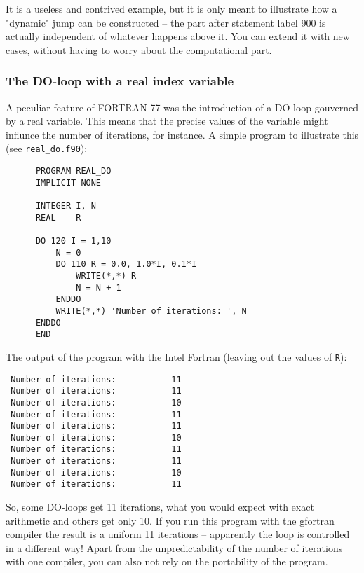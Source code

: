 It is a useless and contrived example, but it is only meant to illustrate how
a "dynamic" jump can be constructed -- the part after statement label 900
is actually independent of whatever happens above it. You can extend it with
new cases, without having to worry about the computational part.

\subsubsection{The DO-loop with a real index variable}
A peculiar feature of FORTRAN 77 was the introduction of a DO-loop gouverned
by a real variable. This means that the precise values of the variable might
influnce the number of iterations, for instance. A simple program to
illustrate this (see \verb+real_do.f90+):
\begin{verbatim}
      PROGRAM REAL_DO
      IMPLICIT NONE

      INTEGER I, N
      REAL    R

      DO 120 I = 1,10
          N = 0
          DO 110 R = 0.0, 1.0*I, 0.1*I
              WRITE(*,*) R
              N = N + 1
          ENDDO
          WRITE(*,*) 'Number of iterations: ', N
      ENDDO
      END
\end{verbatim}

The output of the program with the Intel Fortran (leaving out the values of \verb+R+):
\begin{verbatim}
 Number of iterations:           11
 Number of iterations:           11
 Number of iterations:           10
 Number of iterations:           11
 Number of iterations:           11
 Number of iterations:           10
 Number of iterations:           11
 Number of iterations:           11
 Number of iterations:           10
 Number of iterations:           11
\end{verbatim}

So, some DO-loops get 11 iterations, what you would expect with exact arithmetic
and others get only 10. If you run this program with the gfortran compiler the result
is a uniform 11 iterations -- apparently the loop is controlled in a different way!
Apart from the unpredictability of the number of iterations with one compiler, you
can also not rely on the portability of the program.
